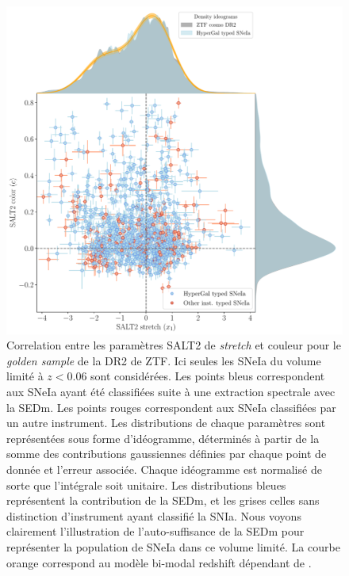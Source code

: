 \documentclass[../main/main.tex]{subfiles}
\begin{document}
\begin{figure}[ht]
  \centering
  \includegraphics[width=1.1\textwidth]{../figures/09_dr2/stretch_color_driftmodel_dr2}
  \caption[Correlation entre les paramètres SALT2 de \textit{stretch} et
  couleur dans l'échantillon à volume limité.]{ Correlation entre les paramètres SALT2 de \textit{stretch} et
    couleur pour le \textit{golden sample} de la DR2 de ZTF. Ici seules les SNeIa du
    volume limité à $z<0.06$ sont considérées. Les points bleus 
    correspondent aux SNeIa ayant été classifiées suite à une extraction
    spectrale avec la SEDm. Les points rouges
    correspondent aux SNeIa classifiées par un autre instrument. Les
    distributions de chaque paramètres sont représentées sous forme
    d'idéogramme, déterminés à partir de la
    somme des contributions gaussiennes définies par chaque point de donnée
    et l'erreur associée. Chaque idéogramme est normalisé de sorte que l'intégrale
    soit unitaire. Les distributions bleues représentent la contribution de
    la SEDm, et les grises celles sans distinction d'instrument ayant
    classifié la SNIa. Nous voyons clairement l'illustration de
    l'auto-suffisance de la SEDm pour représenter la population de SNeIa
    dans ce volume limité. La courbe orange correspond au modèle bi-modal
    redshift dépendant de \citet{NoraNicolas21}.}
  \label{fig:ztfdr2saltcorr}
\end{figure}
\end{document}
